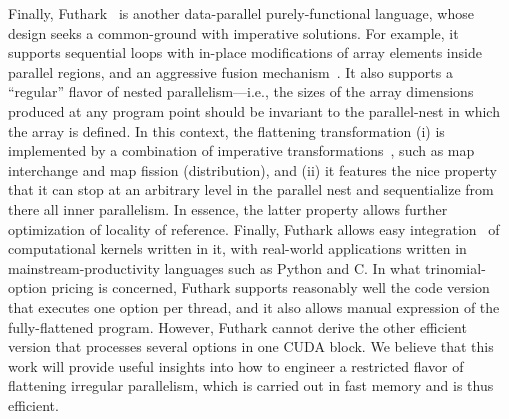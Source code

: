 Finally, Futhark~\cite{henriksen2014bounds} is another data-parallel purely-functional language, whose design seeks a common-ground with imperative solutions. For example, it supports sequential loops with in-place modifications of array elements inside parallel regions, and an aggressive fusion mechanism~\cite{Futhark:redomap}. It also supports a ``regular'' flavor of nested parallelism---i.e., the sizes of the array dimensions produced at any program point should be invariant to the parallel-nest in which the array is defined. In this context, the flattening transformation (i) is implemented by a combination of imperative transformations~\cite{henriksen2017futhark}, such as map interchange and map fission (distribution), and (ii) it features the nice property that it can stop at an arbitrary level in the parallel nest and sequentialize from there all inner parallelism. In essence, the latter property allows further optimization of locality of reference.  Finally, Futhark allows easy integration~\cite{Henriksen:2016:AGT:2975991.2975997} of computational kernels written in it, with real-world applications written in mainstream-productivity languages such as Python and C.   In what trinomial-option pricing is concerned, Futhark supports reasonably well the code version that executes one option per thread, and it also allows manual expression of the fully-flattened program. However, Futhark cannot derive the other efficient version that processes several options in one CUDA block. We believe that this work will provide useful insights into how to engineer a restricted flavor of flattening irregular parallelism, which is carried out in fast memory and is thus efficient.   


